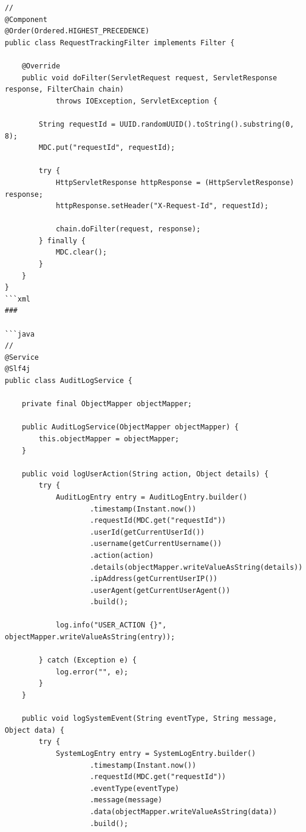 \begin{verbatim}
// 
@Component
@Order(Ordered.HIGHEST_PRECEDENCE)
public class RequestTrackingFilter implements Filter {
    
    @Override
    public void doFilter(ServletRequest request, ServletResponse response, FilterChain chain) 
            throws IOException, ServletException {
        
        String requestId = UUID.randomUUID().toString().substring(0, 8);
        MDC.put("requestId", requestId);
        
        try {
            HttpServletResponse httpResponse = (HttpServletResponse) response;
            httpResponse.setHeader("X-Request-Id", requestId);
            
            chain.doFilter(request, response);
        } finally {
            MDC.clear();
        }
    }
}
```xml
### 

```java
// 
@Service
@Slf4j
public class AuditLogService {
    
    private final ObjectMapper objectMapper;
    
    public AuditLogService(ObjectMapper objectMapper) {
        this.objectMapper = objectMapper;
    }
    
    public void logUserAction(String action, Object details) {
        try {
            AuditLogEntry entry = AuditLogEntry.builder()
                    .timestamp(Instant.now())
                    .requestId(MDC.get("requestId"))
                    .userId(getCurrentUserId())
                    .username(getCurrentUsername())
                    .action(action)
                    .details(objectMapper.writeValueAsString(details))
                    .ipAddress(getCurrentUserIP())
                    .userAgent(getCurrentUserAgent())
                    .build();
                    
            log.info("USER_ACTION {}", objectMapper.writeValueAsString(entry));
            
        } catch (Exception e) {
            log.error("", e);
        }
    }
    
    public void logSystemEvent(String eventType, String message, Object data) {
        try {
            SystemLogEntry entry = SystemLogEntry.builder()
                    .timestamp(Instant.now())
                    .requestId(MDC.get("requestId"))
                    .eventType(eventType)
                    .message(message)
                    .data(objectMapper.writeValueAsString(data))
                    .build();
                    

\end{verbatim}
